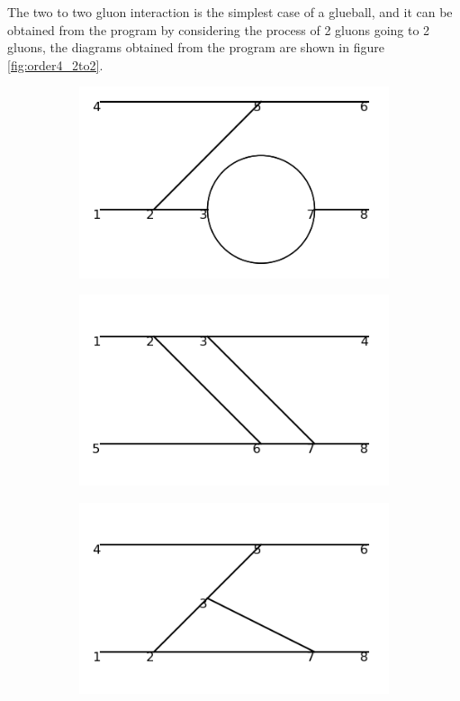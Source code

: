 \documentclass[11pt,a4paper,twoside,pdf]{article}
\numberwithin{equation}{section}
\begin{document}
The two to two gluon interaction is the simplest case of a glueball, and it can be
obtained from the program by considering the process of 2 gluons going to 2 gluons, 
the diagrams obtained from the program are shown in figure \ref{fig:order4_2to2}.

\begin{figure}[h!]
    \centering
    \begin{subfigure}[t]{0.16\textwidth}
        \centering
        \includegraphics[width=\textwidth]{plots/order4_2to2/1.png}
    \end{subfigure}%
    \hfill
    \begin{subfigure}[t]{0.16\textwidth}
        \centering
        \includegraphics[width=\textwidth]{plots/order4_2to2/2.png}
    \end{subfigure}
    \hfill
    \begin{subfigure}[t]{0.16\textwidth}
        \centering
        \includegraphics[width=\textwidth]{plots/order4_2to2/3.png}

\end{subfigure}
\end{figure}
\end{document}
